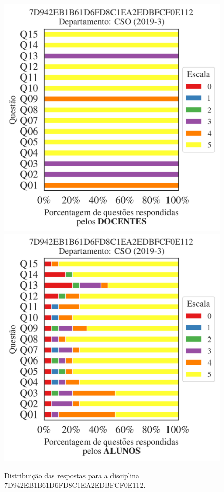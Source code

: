 \documentclass[a4paper,10pt]{article}
\begin{document}
\begin{figure}[h]
\centering
\includegraphics[width=0.485\linewidth]{analise_disciplina_departamento_CSO_7D942EB1B61D6FD8C1EA2EDBFCF0E112_docentes.png}
\includegraphics[width=0.485\linewidth]{analise_disciplina_departamento_CSO_7D942EB1B61D6FD8C1EA2EDBFCF0E112_alunos.png}
\caption{\label{fig:analise_geral_departamento}                Distribuição das respostas para a disciplina 7D942EB1B61D6FD8C1EA2EDBFCF0E112. }
\end{figure}
\end{document}
